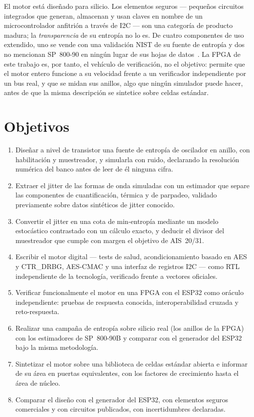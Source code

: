 El motor está diseñado para silicio. Los elementos seguros --- pequeños
circuitos integrados que generan, almacenan y usan claves en nombre de un
microcontrolador anfitrión a través de I2C --- son una categoría de
producto madura; la \emph{transparencia} de su entropía no lo es. De cuatro
componentes de uso extendido, uno se vende con una validación NIST de su
fuente de entropía y dos no mencionan SP~800-90 en ningún lugar de sus
hojas de datos~\cite{nist_esv_e46,
infineon_optiga_trustm_ds, st_stsafe_a110_ds}. La FPGA de este trabajo es,
por tanto, el vehículo de verificación, no el objetivo: permite que el
motor entero funcione a su velocidad frente a un verificador
independiente por un bus real, y que se midan sus anillos, algo que
ningún simulador puede hacer, antes de que la misma descripción se
sintetice sobre celdas estándar.

\section{Objetivos}
\label{sec:objectives}

\begin{enumerate}
\item[O1] Diseñar a nivel de transistor una fuente de entropía de
oscilador en anillo, con habilitación y muestreador, y simularla con
ruido, declarando la resolución numérica del banco antes de leer de él
ninguna cifra.
\item[O2] Extraer el jitter de las formas de onda simuladas con un
estimador que separe las componentes de cuantificación, térmica y de
parpadeo, validado previamente sobre datos sintéticos de jitter conocido.
\item[O3] Convertir el jitter en una cota de min-entropía mediante un
modelo estocástico contrastado con un cálculo exacto, y deducir el
divisor del muestreador que cumple con margen el objetivo de AIS~20/31.
\item[O4] Escribir el motor digital --- tests de salud, acondicionamiento
basado en AES y CTR\_DRBG, AES-CMAC y una interfaz de registros I2C ---
como RTL independiente de la tecnología, verificado frente a vectores
oficiales.
\item[O5] Verificar funcionalmente el motor en una FPGA con el ESP32 como
oráculo independiente: pruebas de respuesta conocida, interoperabilidad
cruzada y reto-respuesta.
\item[O6] Realizar una campaña de entropía sobre silicio real (los anillos
de la FPGA) con los estimadores de SP~800-90B y comparar con el generador
del ESP32 bajo la misma metodología.
\item[O7] Sintetizar el motor sobre una biblioteca de celdas estándar
abierta e informar de su área en puertas equivalentes, con los factores
de crecimiento hasta el área de núcleo.
\item[O8] Comparar el diseño con el generador del ESP32, con elementos
seguros comerciales y con circuitos publicados, con incertidumbres
declaradas.
\end{enumerate}

